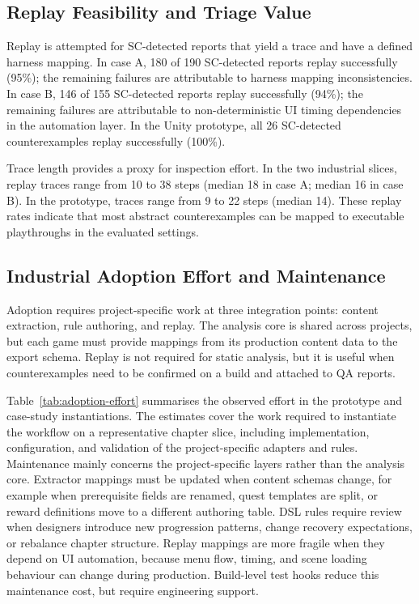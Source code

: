 \documentclass[conference]{IEEEtran}
\begin{document}
\subsection{Replay Feasibility and Triage Value}
\label{sec:replay-results}

Replay is attempted for SC-detected reports that yield a trace and have a
defined harness mapping. In case A, 180 of 190 SC-detected reports replay successfully (95\%); the remaining failures are attributable to harness mapping inconsistencies. In case B, 146 of 155 SC-detected reports replay successfully (94\%); the remaining failures are attributable to
non-deterministic UI timing dependencies in the automation layer. In the
Unity prototype, all 26 SC-detected counterexamples replay successfully
(100\%).

Trace length provides a proxy for inspection effort. In the two
industrial slices, replay traces range from 10 to 38 steps (median 18 in
case A; median 16 in case B). In the prototype, traces range from 9 to
22 steps (median 14). These replay rates indicate that most abstract
counterexamples can be mapped to executable playthroughs in the evaluated
settings.

\subsection{Industrial Adoption Effort and Maintenance}
\label{sec:adoption-effort}

Adoption requires project-specific work at three integration points:
content extraction, rule authoring, and replay. The analysis core is
shared across projects, but each game must provide mappings from its
production content data to the export schema. Replay is not required for
static analysis, but it is useful when counterexamples need to be
confirmed on a build and attached to QA reports.

Table~\ref{tab:adoption-effort} summarises the observed effort in the
prototype and case-study instantiations. The estimates cover the work required to instantiate the workflow on a
representative chapter slice, including implementation, configuration,
and validation of the project-specific adapters and rules. Maintenance
mainly concerns the project-specific layers rather than the analysis core. Extractor mappings must be updated when content schemas
change, for example when prerequisite fields are renamed, quest templates
are split, or reward definitions move to a different authoring table. DSL
rules require review when designers introduce new progression patterns,
change recovery expectations, or rebalance chapter structure. Replay
mappings are more fragile when they depend on UI automation, because menu
flow, timing, and scene loading behaviour can change during production.
Build-level test hooks reduce this maintenance cost, but require
engineering support.
\end{document}
